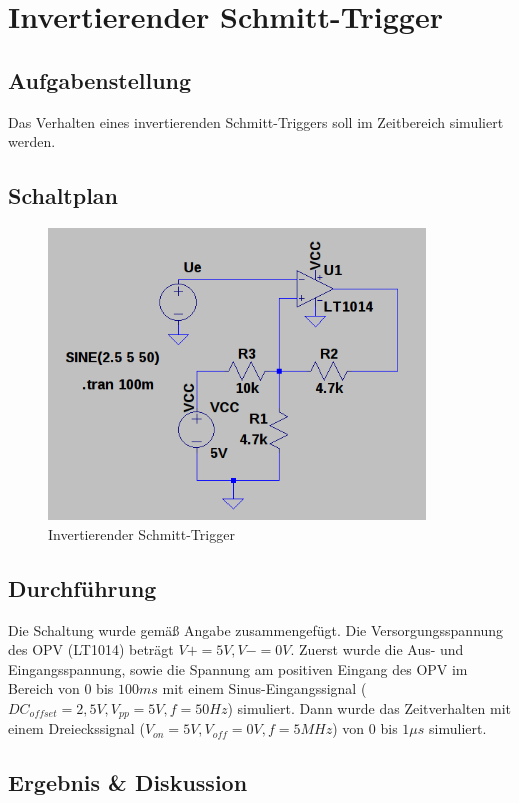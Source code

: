 \documentclass[12pt,a4paper,titlepage]{article}
\begin{document}
\section{Invertierender Schmitt-Trigger}

\subsection{Aufgabenstellung}
Das Verhalten eines invertierenden Schmitt-Triggers soll im Zeitbereich simuliert werden.

\subsection{Schaltplan}
\begin{figure}[H]
  \centering
  \includegraphics[width=100mm]{schmitt_schaltung.png}
  \caption{Invertierender Schmitt-Trigger}
\end{figure}

\subsection{Durchf\"uhrung}
Die Schaltung wurde gem\"aß Angabe zusammengef\"ugt. Die Versorgungsspannung des OPV (LT1014) betr\"agt $V+=5V,V-=0V$. Zuerst wurde die Aus- und Eingangsspannung, sowie die Spannung am positiven Eingang des OPV im Bereich von $0$ bis $100ms$ mit einem Sinus-Eingangssignal ($DC_{offset} = 2,5V, V_{pp} = 5V, f = 50Hz$) simuliert. Dann wurde das Zeitverhalten mit einem Dreieckssignal ($V_{on} = 5V, V_{off} = 0V, f = 5MHz$) von $0$ bis $1\mu s$ simuliert.

\subsection{Ergebnis \& Diskussion}
\end{document}
